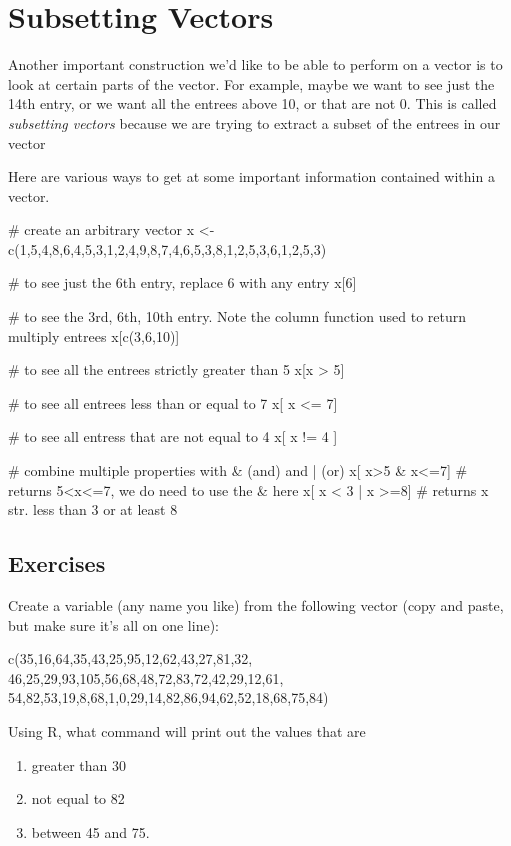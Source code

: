 \section{Subsetting Vectors}

Another important construction we'd like to be able to perform on a
vector is to look at certain parts of the vector. For example, maybe
we want to see just the 14th entry, or we want all the entrees above
10, or that are not 0.  This is called \emph{subsetting vectors}
because we are trying to extract a subset of the entrees in our vector
  
Here are various ways to get at some important information contained
within a vector.
  
\begin{rcode}
  # create an arbitrary vector
  x <- c(1,5,4,8,6,4,5,3,1,2,4,9,8,7,4,6,5,3,8,1,2,5,3,6,1,2,5,3)
  
  # to see just the 6th entry, replace 6 with any entry
  x[6]
  
  # to see the 3rd, 6th, 10th entry. Note the column function used to return multiply entrees
  x[c(3,6,10)]
  
  # to see all the entrees strictly greater than 5
  x[x > 5]
  
  # to see all entrees less than or equal to 7
  x[ x <= 7]
  
  # to see all entress that are not equal to 4
  x[ x != 4 ]
  
  # combine multiple properties with & (and) and | (or)
  x[ x>5 & x<=7] # returns 5<x<=7, we do need to use the & here
  x[ x < 3 | x >=8] # returns x str. less than 3 or at least 8    
\end{rcode}

\subsection{Exercises}

\begin{q}
  Create a variable (any name you like) from the following vector
  (copy and paste, but make sure it's all on one line):

\begin{rcode}
  c(35,16,64,35,43,25,95,12,62,43,27,81,32,
  46,25,29,93,105,56,68,48,72,83,72,42,29,12,61,
  54,82,53,19,8,68,1,0,29,14,82,86,94,62,52,18,68,75,84)
\end{rcode}

  Using R, what command will print out the values that are
  \begin{enumerate}
  \item greater than 30
  \item not equal to 82
  \item between 45 and 75.
  \end{enumerate} 
\end{q} 

